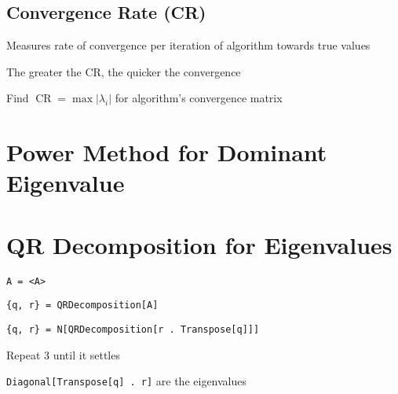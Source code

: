 \documentclass[11pt,letterpaper]{article}
\newenvironment{tight_item}
{\begin{itemize}
\setlength{\parskip}{0pt}
\setlength{\parsep}{0pt}
\setlength{\itemsep}{0pt}
\setlength{\parsep}{0pt}
\setlength{\topsep}{0pt}
\setlength{\partopsep}{0pt}
\setlength{\leftmargin}{0em}
\setlength{\labelwidth}{0em}
\setlength{\labelsep}{1em} }
{\end{itemize}}
\newenvironment{tight_enum}
{\begin{enumerate}
\setlength{\parskip}{0pt}
\setlength{\parsep}{0pt}
\setlength{\itemsep}{0pt}
\setlength{\parsep}{0pt}
\setlength{\topsep}{0pt}
\setlength{\partopsep}{0pt}
\setlength{\leftmargin}{0em}
\setlength{\labelwidth}{0em}
\setlength{\labelsep}{1em} }
{\end{enumerate}}
\begin{document}
{\begin{multicols*}{2}
\subsection{Convergence Rate (CR)}
\begin{tight_item}
\item Measures rate of convergence per iteration of algorithm towards true values
\item The greater the CR, the quicker the convergence
\end{tight_item}
\begin{tight_enum}
\item Find $\operatorname{CR} = \max{|\lambda_{i}|}$ for algorithm's convergence matrix
\end{tight_enum}

\section{Power Method for Dominant Eigenvalue}


\section{QR Decomposition for Eigenvalues}
\begin{tight_enum}
\item \texttt{A = <A>}
\item \texttt{\{q, r\} = QRDecomposition[A]}
\item \texttt{\{q, r\} = N[QRDecomposition[r . Transpose[q]]]}
\item Repeat 3 until it settles
\item \texttt{Diagonal[Transpose[q] . r]} are the eigenvalues
\end{tight_enum}

\end{multicols*}
}
\end{document}
